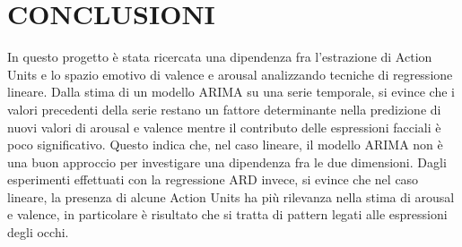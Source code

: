 \documentclass[10pt,journal,compsoc]{IEEEtran}
\begin{document}
\section{CONCLUSIONI}\label{sec:conclusioni}
\IEEEPARstart{}In questo progetto è stata ricercata una dipendenza fra l'estrazione di Action Units e lo spazio emotivo di valence e arousal analizzando tecniche di regressione lineare. Dalla stima di un modello ARIMA su una serie temporale, si evince che i valori precedenti della  serie restano un fattore determinante nella predizione di nuovi valori di arousal e valence mentre il contributo delle espressioni facciali è poco significativo. Questo indica che, nel caso lineare, il modello ARIMA non è una buon approccio per investigare una dipendenza fra le due dimensioni. Dagli esperimenti effettuati con la regressione ARD invece, si evince che nel caso lineare, la presenza di alcune Action Units ha più rilevanza nella stima di arousal e valence, in particolare è risultato che si tratta di pattern legati alle espressioni degli occhi.
\\
\end{document}
